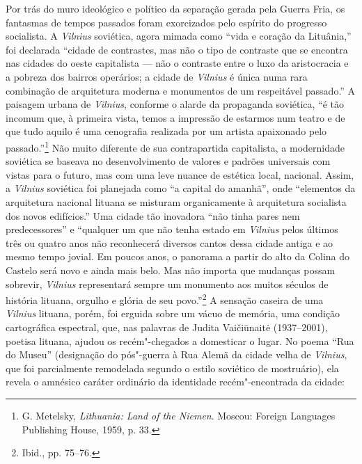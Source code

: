 Por trás do muro ideológico e político da separação gerada pela Guerra
Fria, os fantasmas de tempos passados foram exorcizados pelo espírito do
progresso socialista. A \textit{Vilnius} soviética, agora mimada como ``vida e
coração da Lituânia,'' foi declarada ``cidade de contrastes, mas não o
tipo de contraste que se encontra nas cidades do oeste capitalista --- não
o contraste entre o luxo da aristocracia e a pobreza dos bairros
operários; a cidade de \textit{Vilnius} é única numa rara combinação de
arquitetura moderna e monumentos de um respeitável passado.'' A paisagem
urbana de \textit{Vilnius}, conforme o alarde da propaganda soviética, ``é tão
incomum que, à primeira vista, temos a impressão de estarmos num teatro
e de que tudo aquilo é uma cenografia realizada por um artista
apaixonado pelo passado.''\footnote{G. Metelsky, \textit{Lithuania: Land of the Niemen}. Moscou: Foreign Languages Publishing House, 1959, p. 33.} Não muito diferente de sua contrapartida capitalista, a modernidade soviética se baseava no desenvolvimento de valores e padrões
universais com vistas para o futuro, mas com uma leve nuance de estética
local, nacional. Assim, a \textit{Vilnius} soviética foi planejada como ``a
capital do amanhã'', onde ``elementos da arquitetura nacional lituana se
misturam organicamente à arquitetura socialista dos novos edifícios.''
Uma cidade tão inovadora ``não tinha pares nem predecessores'' e
``qualquer um que não tenha estado em \textit{Vilnius} pelos últimos três ou
quatro anos não reconhecerá diversos cantos dessa cidade antiga e ao
mesmo tempo jovial. Em poucos anos, o panorama a partir do alto da
Colina do Castelo será novo e ainda mais belo. Mas não importa que
mudanças possam sobrevir, \textit{Vilnius} representará sempre um monumento aos
muitos séculos de história lituana, orgulho e glória de seu
povo.''\footnote{Ibid., pp. 75--76.} A sensação caseira de uma \textit{Vilnius}
lituana, porém, foi erguida sobre um vácuo de memória, uma condição
cartográfica espectral, que, nas palavras de Judita Vaičiūnaitė
(1937--2001), poetisa lituana, ajudou os recém"-chegados a domesticar o
lugar. No poema ``Rua do Museu'' (designação do pós"-guerra à Rua Alemã
da cidade velha de \textit{Vilnius}, que foi parcialmente remodelada segundo o
estilo soviético de mostruário), ela revela o amnésico caráter ordinário
da identidade recém"-encontrada da cidade:

